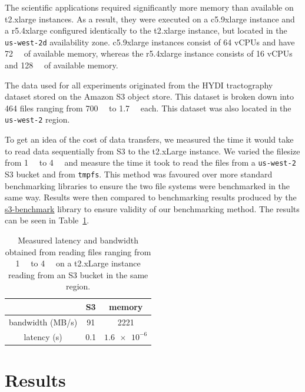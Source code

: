 The scientific applications required significantly more memory than available on
t2.xlarge instances. As a result, they were executed on a c5.9xlarge instance
and a r5.4xlarge configured identically to the t2.xlarge instance, but located
in the \texttt{us-west-2d} availability zone. c5.9xlarge instances consist of 64
vCPUs and have \SI{72}{\gibi\byte} of available memory, whereas the r5.4xlarge
instance consists of 16 vCPUs and \SI{128}{\gibi\byte} of available memory. 

The data used for all experiments originated from the HYDI tractography dataset
stored on the Amazon S3 object store. This dataset is broken down into 464 files
ranging from \SI{700}{\mebi\byte} to \SI{1.7}{\gibi\byte} each. This dataset was
also located in the \texttt{us-west-2} region.

To get an idea of the cost of data transfers, we measured the time it would take
to read data sequentially from S3 to the t2.xLarge instance. We varied the
filesize from \SI{1}{\kibi\byte} to \SI{4}{\gibi\byte} and measure the time it
took to read the files from a \texttt{us-west-2} S3 bucket and from
\texttt{tmpfs}. This method was favoured over more standard benchmarking
libraries to ensure the two file systems were benchmarked in the same way.
Results were then compared to benchmarking results produced by the
\href{https://github.com/dvassallo/s3-benchmark}{s3-benchmark} library to ensure
validity of our benchmarking method. The results can be seen in
Table~\ref{table:rp:benchmarks}.


\begin{table}
\caption{Measured latency and bandwidth obtained from reading files ranging from
\SI{1}{\kibi\byte} to \SI{4}{\gibi\byte} on a t2.xLarge instance reading from an
S3 bucket in the same region.}
\centering
\begin{tabular}{| c | c | c| }
\cline{2-3}
  \multicolumn{1}{c|}{}& S3 & memory \\ 
  \hline
 bandwidth (MB/s) & 91 & 2221 \\  
 latency (s) & 0.1 & $\num{1.6e-6}$ \\
 \hline
\end{tabular}
\label{table:rp:benchmarks}
\end{table}


\section{Results}

